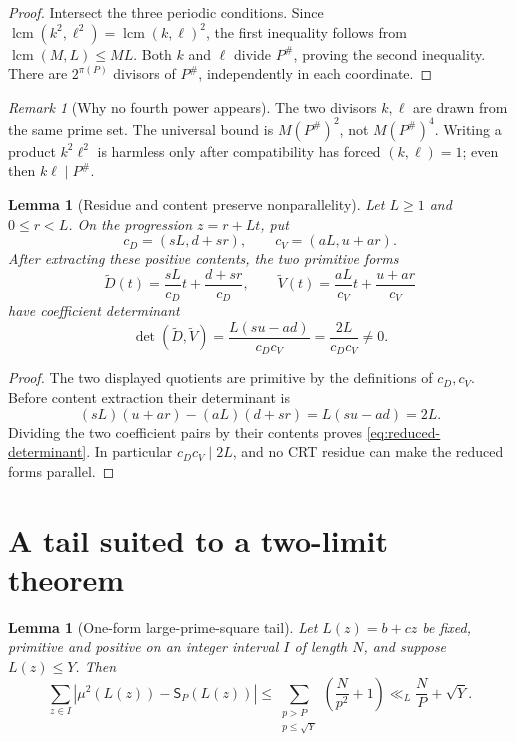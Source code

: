 \documentclass[11pt]{article}
\newtheorem{lemma}[theorem]{Lemma}
\theoremstyle{definition}
\theoremstyle{remark}
\newtheorem{remark}[theorem]{Remark}
\begin{document}
\begin{proof}
Intersect the three periodic conditions.  Since
\(\operatorname{lcm}(k^2,\ell^2)=\operatorname{lcm}(k,\ell)^2\),
the first inequality follows from
\(\operatorname{lcm}(M,L)\le ML\).  Both \(k\) and \(\ell\) divide
\(P^\#\), proving the second inequality.  There are
\(2^{\pi(P)}\) divisors of \(P^\#\), independently in each
coordinate.
\end{proof}

\begin{remark}[Why no fourth power appears]
The two divisors \(k,\ell\) are drawn from the same prime set.  The
universal bound is \(M(P^\#)^2\), not \(M(P^\#)^4\).  Writing a
product \(k^2\ell^2\) is harmless only after compatibility has
forced \((k,\ell)=1\); even then \(k\ell\mid P^\#\).
\end{remark}

\begin{lemma}[Residue and content preserve nonparallelity]
\label{lem:reduced-determinant}
Let \(L\ge1\) and \(0\le r<L\).  On the progression
\(z=r+Lt\), put
\[
 c_D=(sL,d+sr),\qquad c_V=(aL,u+ar).
\]
After extracting these positive contents, the two primitive forms
\[
 \widetilde D(t)=\frac{sL}{c_D}t+\frac{d+sr}{c_D},
 \qquad
 \widetilde V(t)=\frac{aL}{c_V}t+\frac{u+ar}{c_V}
\]
have coefficient determinant
\begin{equation}
 \det(\widetilde D,\widetilde V)
 =
 \frac{L(su-ad)}{c_Dc_V}
 =
 \frac{2L}{c_Dc_V}\ne0.
\label{eq:reduced-determinant}
\end{equation}
\end{lemma}

\begin{proof}
The two displayed quotients are primitive by the definitions of
\(c_D,c_V\).  Before content extraction their determinant is
\[
 (sL)(u+ar)-(aL)(d+sr)=L(su-ad)=2L.
\]
Dividing the two coefficient pairs by their contents proves
\eqref{eq:reduced-determinant}.  In particular \(c_Dc_V\mid2L\),
and no CRT residue can make the reduced forms parallel.
\end{proof}

\section{A tail suited to a two-limit theorem}

\begin{lemma}[One-form large-prime-square tail]
\label{lem:tail}
Let \(L(z)=b+cz\) be fixed, primitive and positive on an integer
interval \(I\) of length \(N\), and suppose \(L(z)\le Y\).  Then
\begin{equation}
 \sum_{z\in I}
 |\mu^2(L(z))-\mathsf S_P(L(z))|
 \le
 \sum_{\substack{p>P\\p\le\sqrt Y}}
 \left(\frac{N}{p^2}+1\right)
 \ll_L \frac NP+\sqrt Y.
\label{eq:tail}
\end{equation}
\end{lemma}
\end{document}
